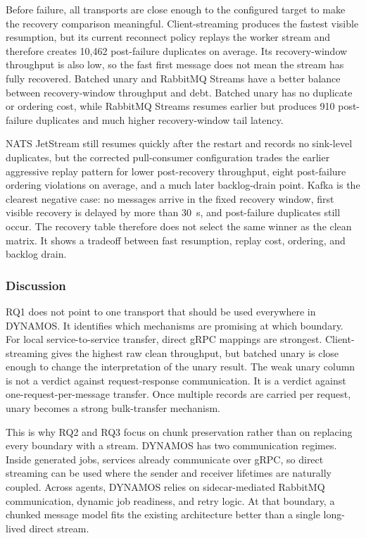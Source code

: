 \newpage

Before failure, all transports are close enough to the configured target to make the recovery comparison meaningful. Client-streaming produces the fastest visible resumption, but its current reconnect policy replays the worker stream and therefore creates 10{,}462 post-failure duplicates on average. Its recovery-window throughput is also low, so the fast first message does not mean the stream has fully recovered. Batched unary and RabbitMQ Streams have a better balance between recovery-window throughput and debt. Batched unary has no duplicate or ordering cost, while RabbitMQ Streams resumes earlier but produces 910 post-failure duplicates and much higher recovery-window tail latency.

NATS JetStream still resumes quickly after the restart and records no sink-level duplicates, but the corrected pull-consumer configuration trades the earlier aggressive replay pattern for lower post-recovery throughput, eight post-failure ordering violations on average, and a much later backlog-drain point. Kafka is the clearest negative case: no messages arrive in the fixed recovery window, first visible recovery is delayed by more than 30~s, and post-failure duplicates still occur. The recovery table therefore does not select the same winner as the clean matrix. It shows a tradeoff between fast resumption, replay cost, ordering, and backlog drain.

\subsubsection{Discussion}

RQ1 does not point to one transport that should be used everywhere in DYNAMOS. It identifies which mechanisms are promising at which boundary. For local service-to-service transfer, direct gRPC mappings are strongest. Client-streaming gives the highest raw clean throughput, but batched unary is close enough to change the interpretation of the unary result. The weak unary column is not a verdict against request-response communication. It is a verdict against one-request-per-message transfer. Once multiple records are carried per request, unary becomes a strong bulk-transfer mechanism.

This is why RQ2 and RQ3 focus on chunk preservation rather than on replacing every boundary with a stream. DYNAMOS has two communication regimes. Inside generated jobs, services already communicate over gRPC, so direct streaming can be used where the sender and receiver lifetimes are naturally coupled. Across agents, DYNAMOS relies on sidecar-mediated RabbitMQ communication, dynamic job readiness, and retry logic. At that boundary, a chunked message model fits the existing architecture better than a single long-lived direct stream.

